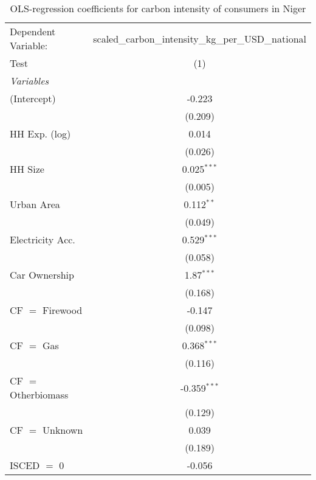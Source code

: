 
\begin{table}[htbp!]
   \centering
   \small
   \begin{adjustbox}{width = 1\textwidth, max height = 0.95\textheight, center}
      \begin{threeparttable}[b]
         \caption{\label{tab:OLS_1_NER} OLS-regression coefficients for carbon intensity of consumers in Niger}
         \begin{tabular}{lc}
            \tabularnewline \midrule \midrule
            Dependent Variable: & scaled\_carbon\_intensity\_kg\_per\_USD\_national\\        
            Test                & (1)\\  
            \midrule
            \emph{Variables}\\
            (Intercept)         & -0.223\\   
                                & (0.209)\\   
            HH Exp. (log)       & 0.014\\   
                                & (0.026)\\   
            HH Size             & 0.025$^{***}$\\   
                                & (0.005)\\   
            Urban Area          & 0.112$^{**}$\\   
                                & (0.049)\\   
            Electricity Acc.    & 0.529$^{***}$\\   
                                & (0.058)\\   
            Car Ownership       & 1.87$^{***}$\\   
                                & (0.168)\\   
            CF $=$ Firewood     & -0.147\\   
                                & (0.098)\\   
            CF $=$ Gas          & 0.368$^{***}$\\   
                                & (0.116)\\   
            CF $=$ Otherbiomass & -0.359$^{***}$\\   
                                & (0.129)\\   
            CF $=$ Unknown      & 0.039\\   
                                & (0.189)\\   
            ISCED $=$ 0         & -0.056\\   

\end{tabular}
\end{threeparttable}
\end{adjustbox}
\end{table}
